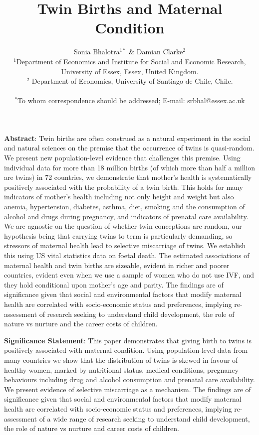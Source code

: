 \documentclass[11pt]{article}
\title{Twin Births and Maternal Condition}
\author{Sonia Bhalotra$^{1\ast}$ \& Damian Clarke$^2$      \\
  \normalsize{$^{1}$Department of Economics and Institute for Social and Economic Research,} \\
  \normalsize{University of Essex, Essex, United Kingdom.}\\
      \normalsize{$^{2}$ Department of Economics, University of Santiago de Chile, Chile.}\\
      \\
      \normalsize{$^\ast$To whom correspondence should be addressed; E-mail:  srbhal@essex.ac.uk}
    }
\date{}
\begin{document}
\baselineskip24pt

\maketitle

\noindent\textbf{Abstract}: Twin births are often construed as a natural experiment in the social and natural sciences on the premise that the occurrence of twins is quasi-random.  We present new population-level evidence that challenges this premise. Using individual data for more than 18 million births (of which more than half a million are twins) in 72 countries, we demonstrate that mother's health is systematically positively associated with the probability of a twin birth. This holds for many indicators of mother's health including not only height and weight but also anemia, hypertension, diabetes, asthma, diet, smoking and the consumption of alcohol and drugs during pregnancy, and indicators of prenatal care availability. We are agnostic on the question of whether twin conceptions are random, our hypothesis being that carrying twins to term is particularly demanding, so stressors of maternal health lead to selective miscarriage of twins. We establish this using US vital statistics data on foetal death. The estimated associations of maternal health and twin births are sizeable, evident in richer and poorer countries, evident even when we use a sample of women who do not use IVF, and they hold conditional upon mother's age and parity. The findings are of significance given that social and environmental factors that modify maternal health are correlated with socio-economic status and preferences, implying re-assessment of research seeking to understand child development, the role of nature vs nurture and the career costs of children.
\vspace{4mm}

\noindent\textbf{Significance Statement}: This paper demonstrates that giving birth to twins is positively associated with maternal condition. Using population-level data from many countries we show that the distribution of twins is skewed in favour of healthy women, marked by nutritional status, medical conditions, pregnancy behaviours including drug and alcohol consumption and prenatal care availability. We present evidence of selective miscarriage as a mechanism. The findings are of significance given that social and environmental factors that modify maternal health are correlated with socio-economic status and preferences, implying re-assessment of a wide range of research seeking to understand child development, the role of nature vs nurture and career costs of children.
\end{document}
